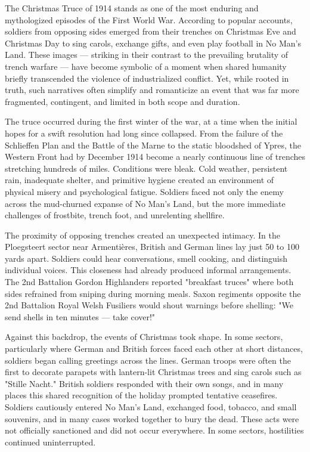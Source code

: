 The Christmas Truce of 1914 stands as one of the most enduring and mythologized episodes of the First World War. According to popular accounts, soldiers from opposing sides emerged from their trenches on Christmas Eve and Christmas Day to sing carols, exchange gifts, and even play football in No Man’s Land. These images — striking in their contrast to the prevailing brutality of trench warfare — have become symbolic of a moment when shared humanity briefly transcended the violence of industrialized conflict. Yet, while rooted in truth, such narratives often simplify and romanticize an event that was far more fragmented, contingent, and limited in both scope and duration.

The truce occurred during the first winter of the war, at a time when the initial hopes for a swift resolution had long since collapsed. From the failure of the Schlieffen Plan and the Battle of the Marne to the static bloodshed of Ypres, the Western Front had by December 1914 become a nearly continuous line of trenches stretching hundreds of miles. Conditions were bleak. Cold weather, persistent rain, inadequate shelter, and primitive hygiene created an environment of physical misery and psychological fatigue. Soldiers faced not only the enemy across the mud-churned expanse of No Man's Land, but the more immediate challenges of frostbite, trench foot, and unrelenting shellfire.

The proximity of opposing trenches created an unexpected intimacy. In the Ploegsteert sector near Armentières, British and German lines lay just 50 to 100 yards apart. Soldiers could hear conversations, smell cooking, and distinguish individual voices. This closeness had already produced informal arrangements. The 2nd Battalion Gordon Highlanders reported "breakfast truces" where both sides refrained from sniping during morning meals. Saxon regiments opposite the 2nd Battalion Royal Welsh Fusiliers would shout warnings before shelling: "We send shells in ten minutes — take cover!"

Against this backdrop, the events of Christmas took shape. In some sectors, particularly where German and British forces faced each other at short distances, soldiers began calling greetings across the lines. German troops were often the first to decorate parapets with lantern-lit Christmas trees and sing carols such as "Stille Nacht." British soldiers responded with their own songs, and in many places this shared recognition of the holiday prompted tentative ceasefires. Soldiers cautiously entered No Man’s Land, exchanged food, tobacco, and small souvenirs, and in many cases worked together to bury the dead. These acts were not officially sanctioned and did not occur everywhere. In some sectors, hostilities continued uninterrupted.

